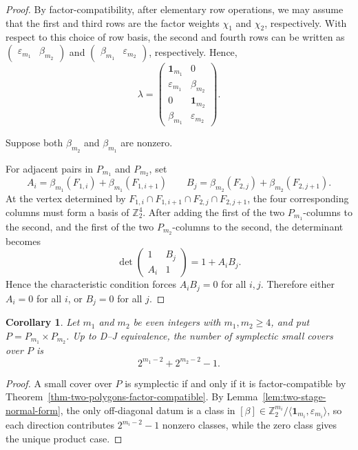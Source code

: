 \documentclass{amsart}
\newtheorem{corollary}[theorem]{Corollary}
\numberwithin{equation}{section}
\theoremstyle{definition}
\theoremstyle{remark}
\newcommand{\Z}{\mathbb Z}
\newcommand{\one}{\mathbf 1}
\begin{document}
\begin{proof}
    By factor-compatibility, after elementary row operations, we may assume that the first and third rows are the factor weights $\chi_1$ and $\chi_2$, respectively. 
    With respect to this choice of row basis, the second and fourth rows can be written as $\begin{pmatrix} \varepsilon_{m_1} & \beta_{m_2}\end{pmatrix}$ and $\begin{pmatrix}  \beta_{m_1} &\varepsilon_{m_2} \end{pmatrix}$, respectively.
    Hence,
    $$
        \lambda=
        \begin{pmatrix}
            \one_{m_1} & 0\\
            \varepsilon_{m_1} & \beta_{m_2}\\
            0 & \one_{m_2}\\
            \beta_{m_1} & \varepsilon_{m_2}
        \end{pmatrix}.
    $$
    
    Suppose both $\beta_{m_2}$ and $\beta_{m_1}$ are nonzero. 
    
    For adjacent pairs in $P_{m_1}$ and $P_{m_2}$, set
    $$
        A_i=\beta_{m_1}(F_{1,i})+\beta_{m_1}(F_{1,i+1}) \qquad B_j=\beta_{m_2}(F_{2,j})+\beta_{m_2}(F_{2,j+1}).
    $$
    At the vertex determined by $F_{1,i}\cap F_{1,i+1}\cap F_{2,j}\cap F_{2,j+1}$, the four corresponding columns must form a basis of $\Z_2^4$. 
    After adding the first of the two $P_{m_1}$-columns to the second, and the first of the two $P_{m_2}$-columns to the second, the determinant becomes
    $$
        \det
        \begin{pmatrix}
            1 & B_j\\
            A_i & 1
        \end{pmatrix}
        = 1+A_iB_j.
    $$
    Hence the characteristic condition forces $A_iB_j=0$ for all $i,j$.
    Therefore either $A_i=0$ for all $i$, or $B_j=0$ for all $j$.
\end{proof}

\begin{corollary}\label{cor:number-two-stage-symplectic}
    Let $m_1$ and $m_2$ be even integers with $m_1,m_2\ge 4$, and put $P=P_{m_1}\times P_{m_2}$.
    Up to D--J equivalence, the number of symplectic small covers over $P$ is
    $$
        2^{m_1-2}+2^{m_2-2}-1.
    $$
\end{corollary}

\begin{proof}
    A small cover over $P$ is symplectic if and only if it is factor-compatible by Theorem~\ref{thm-two-polygons-factor-compatible}.
    By Lemma~\ref{lem:two-stage-normal-form}, the only off-diagonal datum is a class in $[\beta]\in \Z_2^{m_i}/\langle \one_{m_i},\varepsilon_{m_i}\rangle$, so each direction contributes $2^{m_i-2}-1$ nonzero classes, while the zero class gives the unique product case.
\end{proof}
\end{document}
